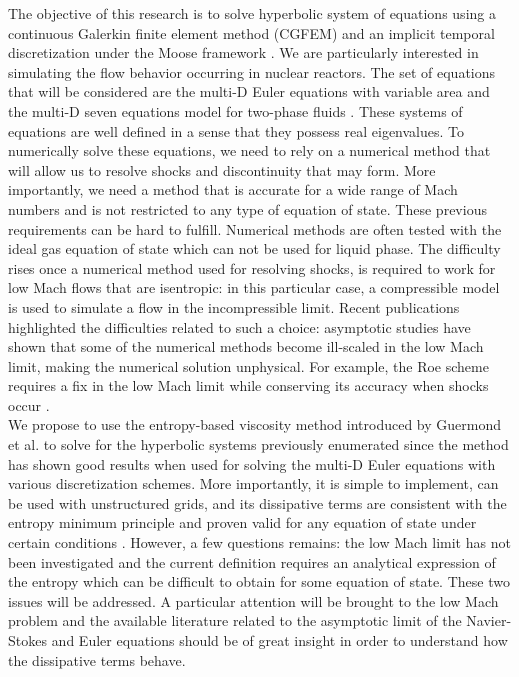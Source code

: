 The objective of this research is to solve hyperbolic system of equations using a continuous Galerkin finite element method (CGFEM) and an implicit temporal discretization under the Moose framework \cite{Moose}. We are particularly interested in simulating the flow behavior occurring in nuclear reactors. The set of equations that will be considered are the multi-D Euler equations with variable area \cite{Toro} and the multi-D seven equations model for two-phase fluids \cite{SEM}. These systems of equations are well defined in a sense that they possess real eigenvalues. To numerically solve these equations, we need to rely on a numerical method that will allow us to resolve shocks and discontinuity that may form. More importantly, we need a method that is accurate for a wide range of Mach numbers and is not restricted to any type of equation of state. These previous requirements can be hard to fulfill. Numerical methods are often tested with the ideal gas equation of state which can not be used for liquid phase. The difficulty rises once a numerical method used for resolving shocks, is required to work for low Mach flows that are isentropic: in this particular case, a compressible model is used to simulate a flow in the incompressible limit. Recent publications \cite{LowMach1, LowMach2} highlighted the difficulties related to such a choice: asymptotic studies have shown that some of the numerical methods become ill-scaled in the low Mach limit, making the numerical solution unphysical. For example, the Roe scheme requires a fix in the low Mach limit while conserving its accuracy when shocks occur \cite{Roe}. \\
We propose to use the entropy-based viscosity method introduced by Guermond et al. to solve for the hyperbolic systems previously enumerated since the method has shown good results when used for solving the multi-D Euler equations with various discretization schemes. More importantly, it is simple to implement, can be used with unstructured grids,  and its dissipative terms are consistent with the entropy minimum principle and proven valid for any equation of state under certain conditions \cite{jlg}. However, a few questions remains: the low Mach limit has not been investigated and the current definition requires an analytical expression of the entropy which can be difficult to obtain for some equation of state. These two issues will be addressed. A particular attention will be brought to the low Mach problem and the available literature related to the asymptotic limit of the Navier-Stokes \cite{Muller} and Euler equations \cite{LowMach1, LowMach2} should be of great insight in order to understand how the dissipative terms behave. \\
